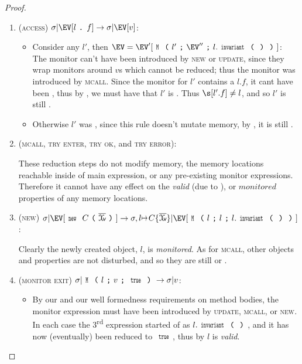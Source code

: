 \begin{proof}
\begin{enumerate}
\item (\textsc{access}) $\sigma|\EV[l\singleDot f] \rightarrow \sigma|\EV[v]$:
	\begin{itemize}
		\item Consider any \mony $l'$, then $\EV = \EV'[\M{l'}{\EV''}{l.\invariant}]$:\\
			The monitor can't have been introduced by \textsc{new} or \textsc{update}, since they wrap monitors around $v$s which cannot be reduced; thus the monitor was introduced by \textsc{mcall}.
			Since the monitor for $l'$ contains a $l.f$, it cant have been \CNA, thus by \CFS, we must have that $l'$ is \CNO. 
			Thus $\s[l'.f] \neq l$, and so $l'$ is still \mony.
		\item Otherwise $l'$ was \valid, since this rule doesn't mutate memory, by , it is still \valid.
\end{itemize}

\item (\textsc{mcall}, \textsc{try enter}, \textsc{try ok}, and \textsc{try error}):

	These reduction steps do not modify memory, the memory locations reachable inside of main expression, or any pre-existing monitor expressions. Therefore it cannot have any effect on the \emph{valid} (due to ), or $\mathit{monitored}$ properties of any memory locations.

\item (\textsc{new}) $\sigma|\EV[\Kw{new}\ C\oR\vs\cR]\rightarrow \sigma,l\mapsto C\{\vs\}|\EV[ \M{l}{l}{l.\invariant}]$:

	Clearly the newly created object, $l$, is \emph{monitored}. As for \textsc{mcall}, other objects and properties are not disturbed, and so they are still \valid or \mony.


\item (\textsc{monitor exit}) $\sigma|\M{l}{v}{\Kw{true}}\rightarrow \sigma|v$:
\begin{itemize}
	\item By our \VS and our well formedness requirements on method bodies, the monitor expression must have been introduced by \textsc{update}, \textsc{mcall}, or \textsc{new}. In each case the 3\textsuperscript{rd} expression started of as $l.\invariant$, and it has now (eventually) been reduced to $\Kw{true}$, thus by  $l$ is \emph{valid}.
\end{itemize} 
\end{enumerate}
\end{proof}


